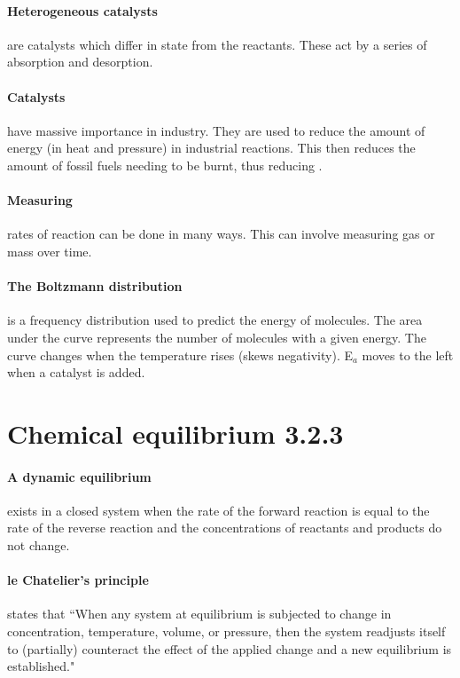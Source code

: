 \documentclass[11pt,a4paper]{memoir}
\begin{document}
	\paragraph{Heterogeneous catalysts} are catalysts which differ in state from the reactants. These act by a series of absorption and desorption.
	
	\paragraph{Catalysts} have massive importance in industry. They are used to reduce the amount of energy (in heat and pressure) in industrial reactions. This then reduces the amount of fossil fuels needing to be burnt, thus reducing .
	
	\paragraph{Measuring} rates of reaction can be done in many ways. This can involve measuring gas or mass over time.
	
	\paragraph{The Boltzmann distribution} is a frequency distribution used to predict the energy of molecules. The area under the curve represents the number of molecules with a given energy. The curve changes when the temperature rises (skews negativity). E$_a$ moves to the left when a catalyst is added.
	
\section{Chemical equilibrium 3.2.3}

	\paragraph{A dynamic equilibrium} exists in a closed system when the rate of the forward reaction is equal to the rate of the reverse reaction and the concentrations of reactants and products do not change.
	
	\paragraph{le Chatelier’s principle} states that ``When any system at equilibrium is subjected to change in concentration, temperature, volume, or pressure, then the system readjusts itself to (partially) counteract the effect of the applied change and a new equilibrium is established."
	
\end{document}
